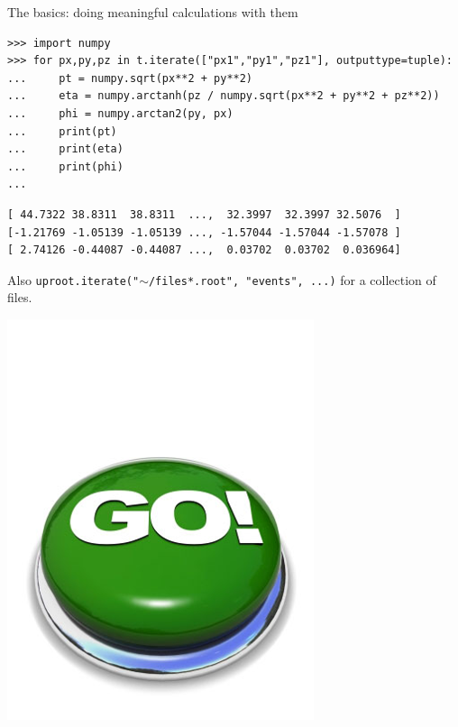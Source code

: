 \documentclass[aspectratio=169]{beamer}
\begin{document}
\begin{frame}[fragile]{The basics: doing meaningful calculations with them}
\vspace{0.5 cm}
\small
\begin{verbatim}
>>> import numpy
>>> for px,py,pz in t.iterate(["px1","py1","pz1"], outputtype=tuple):
...     pt = numpy.sqrt(px**2 + py**2)
...     eta = numpy.arctanh(pz / numpy.sqrt(px**2 + py**2 + pz**2))
...     phi = numpy.arctan2(py, px)
...     print(pt)
...     print(eta)
...     print(phi)
... 
\end{verbatim}
\begin{verbatim}
[ 44.7322 38.8311  38.8311  ...,  32.3997  32.3997 32.5076  ]
[-1.21769 -1.05139 -1.05139 ..., -1.57044 -1.57044 -1.57078 ]
[ 2.74126 -0.44087 -0.44087 ...,  0.03702  0.03702  0.036964]
\end{verbatim}

\vspace{0.5 cm}
Also {\tt uproot.iterate("$\sim$/files*.root", "events", ...)} for a collection of files.

\vspace{-4.5 cm}
\hfill \includegraphics[width=1.5 cm]{safe.png}\hspace{-0.9 cm}
\vspace{4.5 cm}
\end{frame}
\end{document}
